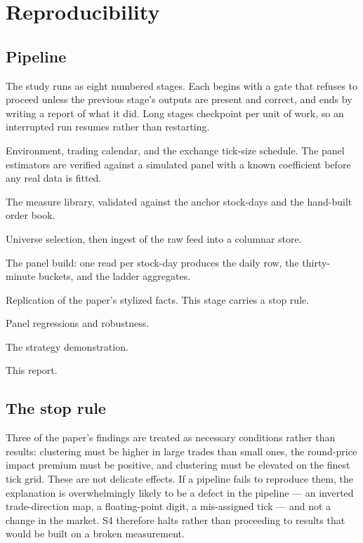 \section{Reproducibility}
\label{app:repro}

\subsection{Pipeline}

The study runs as eight numbered stages. Each begins with a gate that refuses to
proceed unless the previous stage's outputs are present and correct, and ends by
writing a report of what it did. Long stages checkpoint per unit of work, so an
interrupted run resumes rather than restarting.

\begin{description}[leftmargin=4.2em, style=nextline, nosep]
\item[S0] Environment, trading calendar, and the exchange tick-size schedule.
  The panel estimators are verified against a simulated panel with a known
  coefficient before any real data is fitted.
\item[S1] The measure library, validated against the anchor stock-days and the
  hand-built order book.
\item[S2] Universe selection, then ingest of the raw feed into a columnar store.
\item[S3] The panel build: one read per stock-day produces the daily row, the
  thirty-minute buckets, and the ladder aggregates.
\item[S4] Replication of the paper's stylized facts. This stage carries a stop
  rule.
\item[S5] Panel regressions and robustness.
\item[S6] The strategy demonstration.
\item[S7] This report.
\end{description}

\subsection{The stop rule}

Three of the paper's findings are treated as necessary conditions rather than
results: clustering must be higher in large trades than small ones, the
round-price impact premium must be positive, and clustering must be elevated on
the finest tick grid. These are not delicate effects. If a pipeline fails to
reproduce them, the explanation is overwhelmingly likely to be a defect in the
pipeline --- an inverted trade-direction map, a floating-point digit, a
mis-assigned tick --- and not a change in the market. S4 therefore halts rather
than proceeding to results that would be built on a broken measurement.

